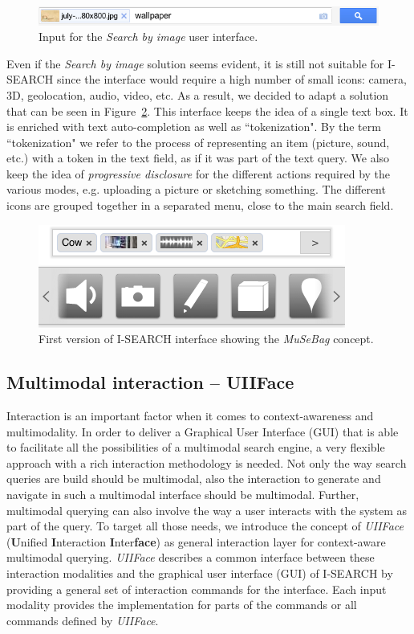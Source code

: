 \documentclass[runningheads,a4paper]{llncs} \usepackage[utf8]{inputenc}
\begin{document}
\begin{figure}[h!]
  \centering
    \includegraphics[width=0.7\linewidth]{resources/search-by-image-UI-box.png}
  \caption{Input for the \textit{Search by image} user interface.}
  \label{fig:search-by-image-box}
\end{figure}

Even if the \textit{Search by image} solution seems evident, it is still not suitable for \mbox{I-SEARCH} since the interface would require a high number of small icons: camera, 3D, geolocation, audio, video, etc.  As a result, we decided to adapt a solution that can be seen in Figure~\ref{fig:isearch-ui}. This interface keeps the idea of a single text box. It is enriched with text auto-completion as well as ``tokenization". By the term ``tokenization" we refer to the process of representing an item (picture, sound, etc.) with a token in the text field, as if it was part of the text query. We also keep the idea of \emph{progressive disclosure} for the different actions required by the various modes, e.g. uploading a picture or sketching something. The different icons are grouped together in a separated menu, close to the main search field.

\begin{figure}[h!]
  \centering
    \includegraphics[width=0.4\linewidth]{resources/isearch-UI-mobile.png}
  \caption{First version of \mbox{I-SEARCH} interface showing the \emph{MuSeBag} concept.}
  \label{fig:isearch-ui}
\end{figure}

\subsection{Multimodal interaction -- UIIFace}
Interaction is an important factor when it comes to context-awareness and multimodality. In order to deliver a Graphical User Interface (GUI) that is able to facilitate all the possibilities of a multimodal search engine, a very flexible approach with a rich interaction methodology is needed. Not only the way search queries are build should be multimodal, also the interaction to generate and navigate in such a multimodal interface should be multimodal. Further, multimodal querying can also involve the way a user interacts with the system as part of the query. To target all those needs, we introduce the concept of \emph{UIIFace} (\textbf{U}nified \textbf{I}nteraction \textbf{I}nter\textbf{face}) as general interaction layer for context-aware multimodal querying. \emph{UIIFace} describes a common interface between these interaction modalities and the graphical user interface (GUI) of \mbox{I-SEARCH} by providing a general set of interaction commands for the interface. Each input modality provides the implementation for parts of the commands or all commands defined by \emph{UIIFace}. 
\end{document}
